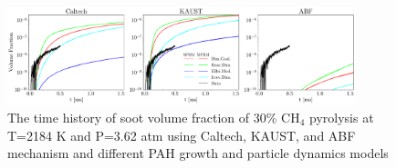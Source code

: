 \begin{figure}[H]
	\centering
	\includegraphics[width=0.9\textwidth]{Figures/Results/Shocktube/Stanford/june/stsh_mech_compare_vf.pdf}
	\caption{The time history of soot volume fraction of 30\% $\mathrm{CH_4}$ pyrolysis at T=2184 K and P=3.62 atm using Caltech, KAUST, and ABF mechanism and different PAH growth and particle dynamics models}
	\label{fig:shocktubestvf} 
\end{figure}